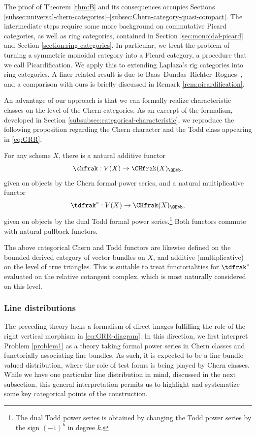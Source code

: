 The proof of Theorem \ref{thm:B} and its consequences occupies Sections \ref{subsec:universal-chern-categories}--\ref{subsec:Chern-category-quasi-compact}. The intermediate steps require some more background on commutative Picard categories, as well as ring categories, contained in Section \ref{sec:monoidal-picard} and Section \ref{section:ring-categories}. In particular, we treat the problem of turning a symmetric monoidal category into a Picard category, a procedure that we call Picardification. We apply this to extending Laplaza's rig categories \cite{Laplaza} into ring categories. A finer related result is due to Baas--Dundas--Richter--Rognes~\cite{BDRR}, and a comparison with ours is briefly discussed in Remark \ref{rem:picardification}.

An advantage of our approach is that we can formally realize characteristic classes on the level of the Chern categories. As an excerpt of the formalism, developed in Section \ref{subsubsec:categorical-characteristic}, we reproduce the following proposition regarding the Chern character and the Todd class appearing in \eqref{eq:GRR}.

\begin{prop}\label{propB}
For any scheme $X$, there is a natural additive functor
\begin{displaymath}
\chfrak : V(X) \to \CHfrak(X)_\QBbb,
\end{displaymath}
given on objects by the Chern formal power series, and a natural multiplicative functor
\begin{displaymath}
\tdfrak^{\ast} : V(X) \to \CHfrak(X)_\QBbb,
\end{displaymath}
given on objects by the dual Todd formal power series.\footnote{The dual Todd power series is obtained by changing the Todd power series by the sign $(-1)^{k}$ in degree $k$.} Both functors commute with natural pullback functors.

\end{prop}
The above categorical Chern and Todd functors are likewise defined on the bounded derived category of vector bundles on $X$, and additive (\resp multiplicative) on the level of true triangles. This is suitable to treat functorialities for $\tdfrak^{\ast}$ evaluated on the relative cotangent complex, which is most naturally considered on this level.

\subsubsection*{Line distributions}
The preceding theory lacks a formalism of direct images fulfilling the role of the right vertical morphism in \eqref{eq:GRR-diagram}. In this direction, we first interpret Problem \ref{problem1} as a theory taking formal power series in Chern classes and functorially associating line bundles. As such, it is expected to be a line bundle-valued distribution, where the role of test forms is being played by Chern classes. While we have one particular line distribution in mind, discussed in the next subsection, this general interpretation permits us to highlight and systematize some key categorical points of the construction.

